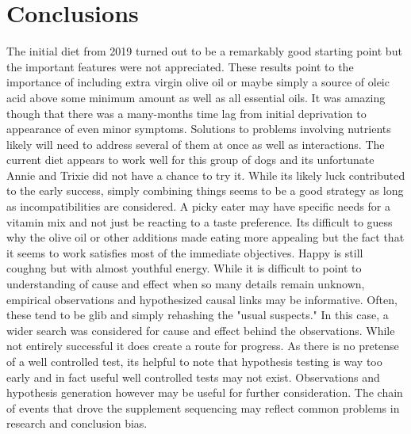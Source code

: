 \section{Conclusions}

The initial diet from 2019 turned out to be a remarkably good
starting point but the important features were not appreciated.
These results point to the importance of including
extra virgin olive oil or maybe simply a source of oleic
acid above some minimum amount as well as all essential oils. 
It was amazing though that there was a many-months time lag from 
initial deprivation to appearance of even minor symptoms.
Solutions to problems
involving nutrients likely will need to address several
of them at once as well as interactions. The current diet appears
to work well for this group of dogs and its unfortunate
Annie and Trixie did not have a chance to try it.
While its likely luck contributed to the early success,
simply combining things seems to be a good strategy as long
as incompatibilities are considered. 
A picky eater may have specific needs for a vitamin mix
and not just be reacting to a taste preference.
Its difficult to guess why the olive oil or other additions
made eating more appealing but the fact that it seems to work
satisfies most of the immediate objectives. Happy is still
coughng but with almost youthful energy.   
While it is difficult to point to understanding of cause and
effect when so many details remain unknown, empirical observations
and hypothesized causal links may be informative. Often, these
tend to be glib and simply rehashing the "usual suspects."
In this case, a wider search was considered for cause and effect
behind the observations. While not entirely successful it
does create a route for progress.  
As there is no pretense of a well controlled test, its helpful
to note that hypothesis testing is way too early and in fact
useful well controlled tests may not exist. Observations and 
hypothesis generation however may be useful for further consideration.
The chain of events that drove the supplement sequencing may
reflect common problems in research and conclusion bias.  

